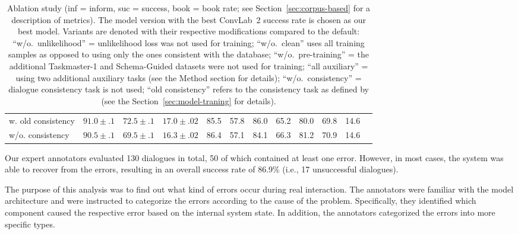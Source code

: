 \documentclass[11pt,a4paper]{article}
\begin{document}
\begin{table}[tp]
\begin{tabular}{l|ccc|ccc|ccc|cc}
    w. old consistency & $91.0 \pm .1$ & $72.5 \pm .1$ & $17.0 \pm .02$ & 85.5 & 57.8 & 86.0 & 65.2 & 80.0 & 69.8 & 14.6  \\
    w/o. consistency & $90.5 \pm .1$ & $69.5 \pm .1$ & $16.3 \pm .02$ &  86.4 & 57.1 & 84.1 & 66.3 & 81.2 & 70.9 & 14.6 \\
    \bottomrule
  \end{tabular}
  \caption{Ablation study (inf = inform, suc = success, book = book rate; see Section~\ref{sec:corpus-based} for a description of metrics). The model version with the best ConvLab~2 success rate is chosen as our best model. Variants are denoted with their respective modifications compared to the default: ``w/o.\ unlikelihood'' = unlikelihood loss was not used for training; ``w/o.\ clean'' uses all training samples as opposed to using only the ones consistent with the database; ``w/o.\ pre-training'' = the additional Taskmaster-1 and Schema-Guided datasets were not used for training; ``all auxiliary'' = using two additional auxiliary tasks (see the Method section for details); ``w/o.\ consistency'' = dialogue consistency task is not used; ``old consistency'' refers to the consistency task as defined by \citet{peng2020} (see the Section~\ref{sec:model-traning} for details).}
  \label{tab:ablation_comparison}
\end{table}


Our expert annotators evaluated 130 dialogues in total, 50 of which contained at least one error.
However, in most cases, the system was able to recover from the errors, resulting in an overall success rate of 86.9\% (i.e., 17 unsuccessful dialogues).

The purpose of this analysis was to find out what kind of errors occur during real interaction.
The annotators were familiar with the model architecture and were instructed to categorize the errors according to the cause of the problem.
Specifically, they identified which component caused the respective error based on the internal system state.
In addition, the annotators categorized the errors into more specific types. %
\end{document}
